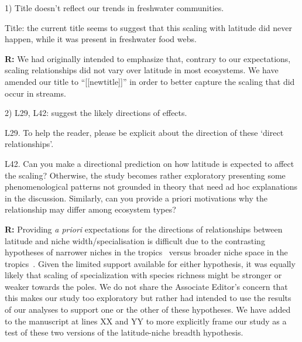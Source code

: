 \documentclass[12pt]{letter}
\newenvironment{refquote}{\bigskip \begin{it}}{\end{it}\smallskip}
\begin{document}
  1) Title doesn't reflect our trends in freshwater communities.

  \begin{refquote}

    Title: the current title seems to suggest that this scaling with latitude
    did never happen, while it was present in freshwater food webs.

  \end{refquote}


  \textbf{R:} We had originally intended to emphasize that, contrary to our expectations,
  scaling relationships did not vary over latitude in most ecosystems. We have amended our
  title to ``[[newtitle]]'' in order to better capture the scaling that did occur in streams.


  2) L29, L42: suggest the likely directions of effects.

  \begin{refquote}

    L29. To help the reader, please be explicit about the direction of these ‘direct relationships’.

    \smallskip

    L42. Can you make a directional prediction on how latitude is expected to
    affect the scaling? Otherwise, the study becomes rather exploratory
    presenting some phenomenological patterns not grounded in theory that need
    ad hoc explanations in the discussion. Similarly, can you provide a priori
    motivations why the relationship may differ among ecosystem types?

  \end{refquote}


  \textbf{R:} Providing \emph{a priori} expectations for the directions of relationships between latitude and niche width/specialisation is difficult due to the 
  contrasting hypotheses of narrower niches in the tropics~\citep{Vazquez2004} versus broader niche space in the tropics~\citep{Davies2007}. Given the limited support available for either hypothesis, it was equally likely that scaling of specialization with species richness might be stronger or weaker towards the poles. 
  We do not share the Associate Editor's concern that this makes our study too exploratory but rather had intended to use the results of our analyses to support one or the other of these hypotheses. We have added to the manuscript at lines XX and YY to more explicitly frame our study as a test of these two versions of the latitude-niche breadth hypothesis.
\end{document}

